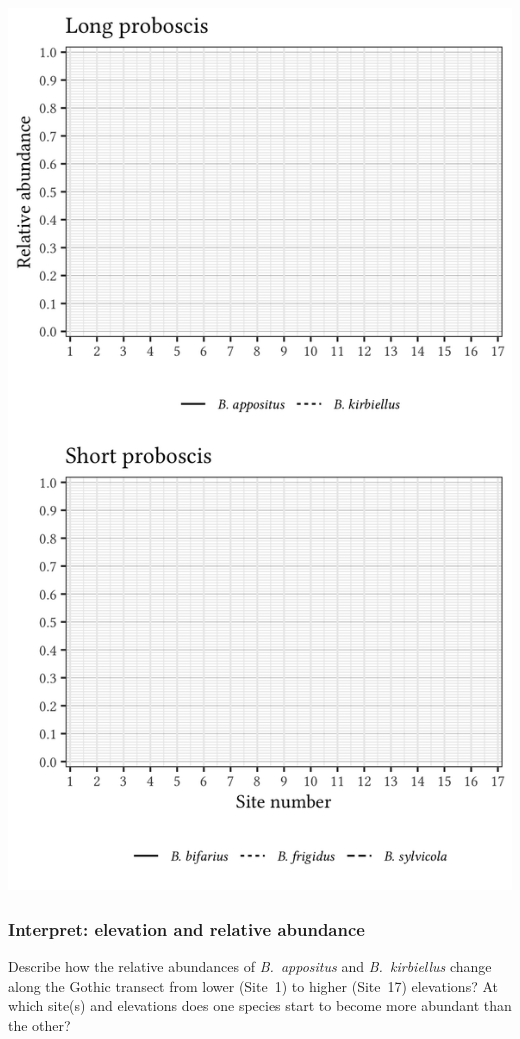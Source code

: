 \documentclass[12pt, hidelinks]{exam}
\begin{document}
\begin{questions}
	\includegraphics[height =\textheight]{gothic_relative_abundance_blank}
\fi

\subsubsection*{Interpret: elevation and relative abundance}
\question
Describe how the relative abundances of \textit{B.~appositus} and 
\textit{B.~kirbiellus} change along the Gothic transect from
lower (Site~1) to higher (Site~17) elevations? At which site(s)
and elevations does one species start to become more abundant
than the other?


\end{questions}
\end{document}
